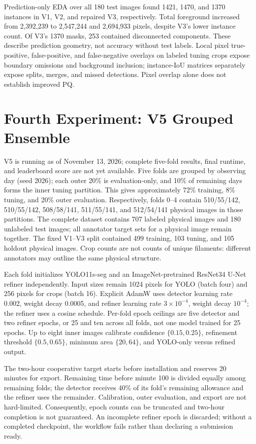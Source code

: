 \documentclass[sigconf]{acmart}
\begin{document}
Prediction-only EDA over all 180 test images found 1421, 1470, and 1370
instances in V1, V2, and repaired V3, respectively. Total foreground
increased from 2,392,239 to 2,547,244 and 2,694,933 pixels, despite V3's
lower instance count. Of V3's 1370 masks, 253 contained disconnected
components. These describe prediction geometry, not accuracy without
test labels. Local pixel true-positive, false-positive, and false-negative
overlays on labeled tuning crops expose boundary omissions and background
inclusion; instance-IoU matrices separately expose splits, merges, and
missed detections. Pixel overlap alone does not establish improved PQ.

\section{Fourth Experiment: V5 Grouped Ensemble}
V5 is running as of November 13, 2026; complete five-fold results, final
runtime, and leaderboard score are not yet available. Five folds are grouped by observing
day (seed 2026); each outer 20\% is evaluation-only, and 10\% of remaining
days forms the inner tuning partition. This gives approximately
72\% training, 8\% tuning, and 20\% outer evaluation. Respectively,
folds 0--4 contain 510/55/142, 510/55/142, 508/58/141, 511/55/141,
and 512/54/141 physical images in those partitions. The complete dataset
contains 707 labeled physical images and 180 unlabeled test images;
all annotator target sets for a physical image remain together.
The fixed V1--V3 split contained 499 training, 103 tuning, and 105
holdout physical images. Crop counts are not counts of unique filaments:
different annotators may outline the same physical structure.

Each fold initializes YOLO11s-seg and an ImageNet-pretrained ResNet34
U-Net refiner independently. Input sizes remain 1024 pixels for YOLO
(batch four) and 256 pixels for crops (batch 16). Explicit AdamW uses
detector learning rate 0.002, weight decay 0.0005, and refiner learning
rate $3\times10^{-4}$, weight decay $10^{-4}$; the refiner uses a
cosine schedule. Per-fold epoch ceilings are five detector and two
refiner epochs, or 25 and ten across all folds, not one model trained
for 25 epochs. Up to eight inner images calibrate confidence
$\{0.15,0.25\}$, refinement threshold $\{0.5,0.65\}$, minimum area
$\{20,64\}$, and YOLO-only versus refined output.

The two-hour cooperative target starts before installation and reserves
20 minutes for export. Remaining time before minute 100 is divided
equally among remaining folds; the detector receives 40\% of its fold's
remaining allowance and the refiner uses the remainder. Calibration,
outer evaluation, and export are not hard-limited. Consequently, epoch
counts can be truncated and two-hour completion is not guaranteed.
An incomplete refiner epoch is discarded; without a completed checkpoint,
the workflow fails rather than declaring a submission ready.
\end{document}
